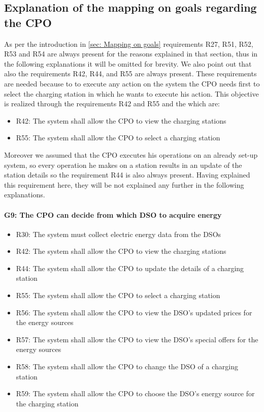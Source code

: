 \subsection{Explanation of the mapping on goals regarding the CPO}
As per the introduction in \ref{sec: Mapping on goals} requirements R27, R51, R52, R53 and R54 are always present for the reasons explained in that section, thus in the following explanations it will be omitted for brevity. We also point out that also the requirements R42, R44, and R55 are always present. These requirements are needed because to to execute any action on the system the CPO needs first to select the charging station in which he wants to execute his action. This objective is realized through the requirements R42 and R55 and the which are:
\begin{itemize}
    \item R42: The system shall allow the CPO to view the charging stations
    \item R55: The system shall allow the CPO to select a charging station
\end{itemize}
Moreover we assumed that the CPO executes his operations on an already set-up system, so every operation he makes on a station results in an update of the station details so the requirement R44 is also always present. Having explained this requirement here, they will be not explained any further in the following explanations.
\paragraph{G9: The CPO can decide from which DSO to acquire energy}
\begin{itemize}
    \item R30: The system must collect electric energy data from the DSOs
    \item R42: The system shall allow the CPO to view the charging stations
    \item R44: The system shall allow the CPO to update the details of a charging station
    \item R55: The system shall allow the CPO to select a charging station
    \item R56: The system shall allow the CPO to view the DSO's updated prices for the energy sources
    \item R57: The system shall allow the CPO to view the DSO's special offers for the energy sources
    \item R58: The system shall allow the CPO to change the DSO of a charging station
    \item R59: The system shall allow the CPO to choose the DSO's energy source for the charging station
\end{itemize}

